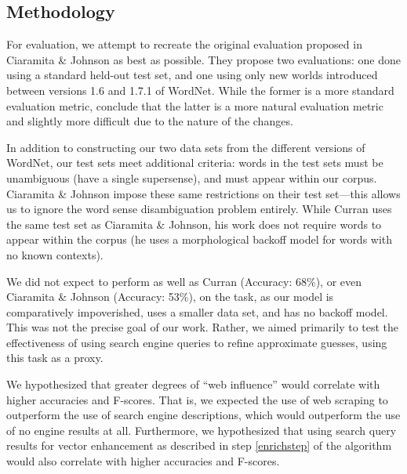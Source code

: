 \documentclass{article}
\begin{document}
\subsection{Methodology}


For evaluation, we attempt to recreate the original evaluation proposed in Ciaramita \& Johnson \cite{cj} as best as possible. 
They propose two evaluations: one done using a standard held-out test set, and one using only new worlds introduced between versions 1.6 and 1.7.1 of WordNet. 
While the former is a more standard evaluation metric, \cite{cj} conclude that the latter is a more natural evaluation metric and slightly more difficult due to the nature of the changes.

In addition to constructing our two data sets from the different versions of WordNet, our test sets meet additional criteria: words in the test sets must be unambiguous (have a single supersense), and must appear within our corpus. 
Ciaramita \& Johnson \cite{cj} impose these same restrictions on their test set---this allows us to ignore the word sense disambiguation problem entirely.
While Curran \cite{curran} uses the same test set as Ciaramita \& Johnson, his work does not require words to appear within the corpus (he uses a morphological backoff model for words with no known contexts).

We did not expect to perform as well as Curran \cite{curran} (Accuracy: 68\%), or even Ciaramita \& Johnson \cite{cj} (Accuracy: 53\%), on the task, as our model is comparatively impoverished, uses a smaller data set, and has no backoff model. 
This was not the precise goal of our work. 
Rather, we aimed primarily to test the effectiveness of using search engine queries to refine approximate guesses, using this task as a proxy.

We hypothesized that greater degrees of ``web influence'' would correlate with higher accuracies and F-scores. 
That is, we expected the use of web scraping to outperform the use of search engine descriptions, which would outperform the use of no engine results at all.
Furthermore, we hypothesized that using search query results for vector enhancement as described in step \ref{enrichstep} of the algorithm would also correlate with higher accuracies and F-scores.
\end{document}
